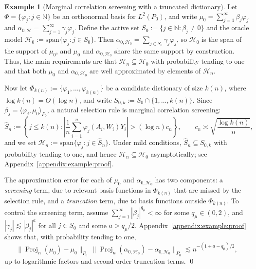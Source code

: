 \documentclass[11pt]{article}
\theoremstyle{definition}
\newtheorem{example}{Example}
\begin{document}
\begin{example}[Marginal correlation screening with a truncated dictionary]
\label{example::screening}
Let \(\Phi=\{\varphi_j:j\in\mathbb N\}\) be an orthonormal basis for \(L^2(P_0)\), and write \(\mu_0=\sum_{j=1}^\infty \beta_j\varphi_j\) and \(\alpha_{0,\mathcal H}=\sum_{j=1}^\infty \gamma_j\varphi_j\). Define the active set \(S_0:=\{j\in\mathbb N:\beta_j\neq 0\}\) and the oracle model \(\mathcal H_0:=\mathrm{span}\{\varphi_j:j\in S_0\}\). Then \(\alpha_{0,\mathcal H_0}=\sum_{j\in S_0}\gamma_j\varphi_j\), so \(\mathcal H_0\) is the span of the support of \(\mu_0\), and \(\mu_0\) and \(\alpha_{0,\mathcal H_0}\) share the same support by construction. Thus, the main requirements are that \(\mathcal H_n \subseteq \mathcal H_0\) with probability tending to one and that both \(\mu_0\) and \(\alpha_{0,\mathcal H_0}\) are well approximated by elements of \(\mathcal H_n\).

Now let \(\Phi_{k(n)}:=\{\varphi_1,\ldots,\varphi_{k(n)}\}\) be a candidate dictionary of size \(k(n)\), where \(\log k(n)=O(\log n)\), and write \(S_{0,k}:=S_0\cap\{1,\ldots,k(n)\}\). Since \(\beta_j=\langle \varphi_j,\mu_0\rangle_{P_0}\), a natural selection rule is marginal correlation screening:
\[
\widehat S_n
:=
\left\{
j \le k(n):
\left|
\frac{1}{n}\sum_{i=1}^n \varphi_j(A_i,W_i)Y_i
\right| > (\log n)c_n
\right\},
\qquad
c_n \asymp \sqrt{\frac{\log k(n)}{n}},
\]
and we set \(\mathcal H_n:=\mathrm{span}\{\varphi_j:j\in \widehat S_n\}\). Under mild conditions, \(\widehat S_n \subseteq S_{0,k}\) with probability tending to one, and hence \(\mathcal H_n \subseteq \mathcal H_0\) asymptotically; see Appendix~\ref{appendix:example:proof}.

The approximation error for each of \(\mu_0\) and \(\alpha_{0,\mathcal H_0}\) has two components: a \emph{screening} term, due to relevant basis functions in \(\Phi_{k(n)}\) that are missed by the selection rule, and a \emph{truncation} term, due to basis functions outside \(\Phi_{k(n)}\). To control the screening term, assume \(\sum_{j=1}^\infty |\beta_j|^{q_\mu}<\infty\) for some \(q_\mu\in(0,2)\), and \(|\gamma_j|\lesssim |\beta_j|^a\) for all \(j\in S_0\) and some \(a>q_\mu/2\). Appendix~\ref{appendix:example:proof} shows that, with probability tending to one,
\[
\|\operatorname{Proj}_n(\mu_0)-\mu_0\|_{P_0}
\,
\|\operatorname{Proj}_n(\alpha_{0,\mathcal H_0})-\alpha_{0,\mathcal H_0}\|_{P_0}
\lesssim
n^{-(1+a-q_\mu)/2},
\]
up to logarithmic factors and second-order truncation terms.
\qed
\end{example}
\end{document}
